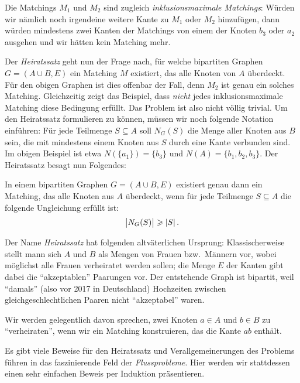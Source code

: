 Die Matchings $M_1$ und $M_2$ sind zugleich \emph{inklusionsmaximale Matchings}: Würden wir nämlich noch irgendeine weitere Kante zu $M_1$ oder $M_2$ hinzufügen, dann würden mindestens zwei Kanten der Matchings von einem der Knoten $b_3$ oder $a_2$ ausgehen und wir hätten kein Matching mehr.

Der \emph{Heiratssatz}
geht nun der Frage nach, für welche bipartiten Graphen $G=(A\cup B,E)$ ein Matching $M$ existiert, das alle Knoten von $A$ überdeckt. Für den obigen Graphen ist dies offenbar der Fall, denn $M_2$ ist genau ein solches Matching. Gleichzeitig zeigt das Beispiel, dass \emph{nicht} jedes inklusionsmaximale Matching diese Bedingung erfüllt. Das Problem ist also nicht völlig trivial. Um den Heiratssatz formulieren zu können, müssen wir noch folgende Notation einführen: Für jede Teilmenge $S\subseteq A$ soll $N_G(S)$ die Menge aller Knoten aus $B$ sein, die mit mindestens einem Knoten aus $S$ durch eine Kante verbunden sind. Im obigen Beispiel ist etwa $N(\{a_1\})=\{b_3\}$ und $N(A)=\{b_1,b_2,b_3\}$. Der Heiratssatz besagt nun Folgendes:
\begin{satzmitnamen}[Heiratssatz]
	In einem bipartiten Graphen $G=(A\cup B,E)$ existiert genau dann ein Matching, das alle Knoten aus $A$ überdeckt, wenn für jede Teilmenge $S\subseteq A$ die folgende Ungleichung erfüllt ist:
	\begin{equation*}
		\abs[\big]{N_G(S)}\geqslant \abs{S}\,.
	\end{equation*}
\end{satzmitnamen}
Der Name \emph{Heiratssatz} hat folgenden altväterlichen Ursprung: Klassischerweise stellt mann sich $A$ und $B$ als Mengen von Frauen bzw.\ Männern vor, wobei möglichst alle Frauen verheiratet werden sollen; die Menge $E$ der Kanten gibt dabei die \enquote{akzeptablen} Paarungen vor. Der entstehende Graph ist bipartit, weil \enquote{damals} (also vor 2017 in Deutschland) Hochzeiten zwischen gleichgeschlechtlichen Paaren nicht \enquote{akzeptabel} waren.

Wir werden gelegentlich davon sprechen, zwei Knoten $a\in A$ und $b\in B$ zu \enquote{verheiraten}, wenn wir ein Matching konstruieren, das die Kante $ab$ enthält.

Es gibt viele Beweise für den Heiratssatz und Verallgemeinerungen des Problems führen in das faszinierende Feld der \emph{Flussprobleme}. Hier werden wir stattdessen einen sehr einfachen Beweis per Induktion präsentieren.

